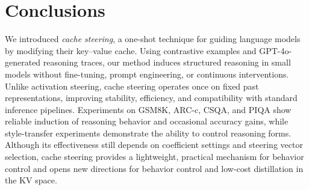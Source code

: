 \documentclass{article} %
\begin{document}



\section{Conclusions}

We introduced \emph{cache steering}, a one-shot technique for guiding language models by modifying their key–value cache. Using contrastive examples and GPT-4o-generated reasoning traces, our method induces structured reasoning in small models without fine-tuning, prompt engineering, or continuous interventions. Unlike activation steering, cache steering operates once on fixed past representations, improving stability, efficiency, and compatibility with standard inference pipelines. Experiments on GSM8K, ARC-c, CSQA, and PIQA show reliable induction of reasoning behavior and occasional accuracy gains, while style-transfer experiments demonstrate the ability to control reasoning forms. Although its effectiveness still depends on coefficient settings and steering vector selection, cache steering provides a lightweight, practical mechanism for behavior control and opens new directions for behavior control and low-cost distillation in the KV space.
\end{document}
